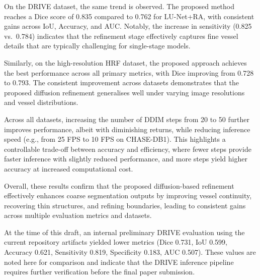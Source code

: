 \documentclass[journal,article,submit,pdftex,moreauthors]{Definitions/mdpi}
\begin{document}
On the DRIVE dataset, the same trend is observed. The proposed method reaches a Dice score of 0.835 compared to 0.762 for LU-Net+RA, with consistent gains across IoU, Accuracy, and AUC. Notably, the increase in sensitivity (0.825 vs.\ 0.784) indicates that the refinement stage effectively captures fine vessel details that are typically challenging for single-stage models.

Similarly, on the high-resolution HRF dataset, the proposed approach achieves the best performance across all primary metrics, with Dice improving from 0.728 to 0.793. The consistent improvement across datasets demonstrates that the proposed diffusion refinement generalises well under varying image resolutions and vessel distributions.

Across all datasets, increasing the number of DDIM steps from 20 to 50 further improves performance, albeit with diminishing returns, while reducing inference speed (e.g., from 25 FPS to 10 FPS on CHASE-DB1). This highlights a controllable trade-off between accuracy and efficiency, where fewer steps provide faster inference with slightly reduced performance, and more steps yield higher accuracy at increased computational cost.

Overall, these results confirm that the proposed diffusion-based refinement effectively enhances coarse segmentation outputs by improving vessel continuity, recovering thin structures, and refining boundaries, leading to consistent gains across multiple evaluation metrics and datasets.

At the time of this draft, an internal preliminary DRIVE evaluation using the current repository artifacts yielded lower metrics (Dice 0.731, IoU 0.599, Accuracy 0.621, Sensitivity 0.819, Specificity 0.183, AUC 0.507). These values are noted here for comparison and indicate that the DRIVE inference pipeline requires further verification before the final paper submission.
\end{document}
